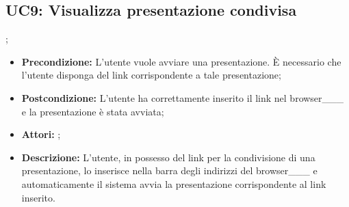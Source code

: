 \subsection{ UC9: Visualizza presentazione condivisa}
;
\begin{itemize}
	\item \textbf{Precondizione:} L’utente vuole avviare una presentazione. È necessario che l’utente disponga del link corrispondente a tale presentazione;
	\item \textbf{Postcondizione:} L’utente ha correttamente inserito il link nel browser___ e la presentazione è stata avviata;
	\item \textbf{Attori:} ;
	\item \textbf{Descrizione:} L’utente, in possesso del link per la condivisione di una presentazione, lo inserisce nella barra degli indirizzi del browser___ e automaticamente il sistema avvia la presentazione corrispondente al link inserito.
\end{itemize}
